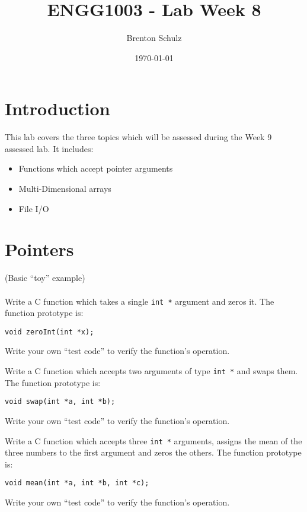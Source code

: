 \documentclass{lab}
\title{ENGG1003 - Lab Week 8}
\author{Brenton Schulz}
\date{\today}
\begin{document}
\maketitle

\section{Introduction}

This lab covers the three topics which will be assessed during the Week 9 assessed lab. It includes:

\begin{itemize}
	\item Functions which accept pointer arguments
	\item Multi-Dimensional arrays
	\item File I/O
\end{itemize}

\section{Pointers}

\begin{task}{}{}
(Basic ``toy'' example)
\\~\\
Write a C function which takes a single \texttt{int *} argument and zeros it. The function prototype is:
\begin{lstlisting}[style=Ctable]
void zeroInt(int *x);
\end{lstlisting}

Write your own ``test code'' to verify the function's operation.
\end{task}

\begin{task}{}{}
Write a C function which accepts two arguments of type \texttt{int *} and swaps them. The function prototype is:

\begin{lstlisting}[style=Ctable]
void swap(int *a, int *b);
\end{lstlisting}

Write your own ``test code'' to verify the function's operation.
\end{task}

\begin{task}{}{}
Write a C function which accepts three \texttt{int *} arguments, assigns the mean of the three numbers to the first argument and zeros the others. The function prototype is:

\begin{lstlisting}[style=Ctable]
void mean(int *a, int *b, int *c);
\end{lstlisting}

Write your own ``test code'' to verify the function's operation.
\end{task}
\end{document}
